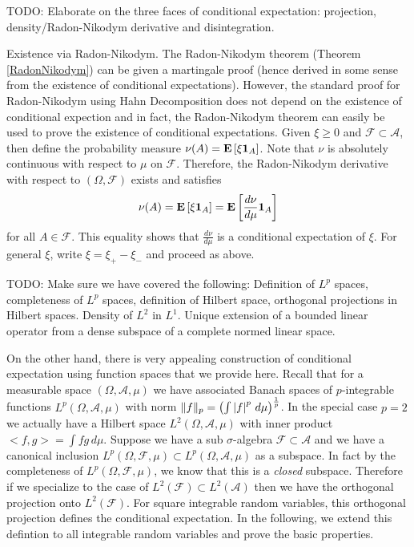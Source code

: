 TODO: Elaborate on the three faces of conditional expectation:
projection, density/Radon-Nikodym derivative and disintegration.

Existence via Radon-Nikodym.  The Radon-Nikodym theorem (Theorem
\ref{RadonNikodym}) can
be given a martingale proof (hence derived in some sense from the
existence of conditional expectations).  However, the standard proof
for Radon-Nikodym using
Hahn Decomposition does not depend on the existence of conditional
expection and in fact, the Radon-Nikodym theorem can easily be used to
prove the existence of conditional expectations.
Given $\xi \geq 0$ and $\mathcal{F} \subset \mathcal{A}$, then define
the probability measure $\nu(A) =
\textbf{E}\left[\xi \textbf{1}_{A}\right]$.  Note that $\nu$ is absolutely
continuous with respect to $\mu$ on $\mathcal{F}$.  Therefore, the Radon-Nikodym
derivative with respect to $(\Omega, \mathcal{F})$ exists and
satisfies 
\begin{align*}
\nu(A) = \textbf{E}\left[\xi \textbf{1}_{A}\right] =
\textbf{E}\left[\frac{d\nu}{d\mu} \textbf{1}_{A}\right]
\end{align*}
for all $A \in \mathcal{F}$.  This equality shows that
$\frac{d\nu}{d\mu}$ is a conditional expectation of $\xi$.  For
general $\xi$, write $\xi=\xi_+ - \xi_-$ and proceed as above.
 
TODO: Make sure we have covered the following:  Definition of $L^p$
spaces, completeness of $L^p$ spaces, definition of Hilbert space,
orthogonal projections in Hilbert spaces.  Density of $L^2$ in $L^1$.
Unique extension of a bounded linear operator from a dense subspace
of a complete normed linear space.

On the other hand, there is very appealing construction of conditional
expectation using function spaces that we provide here.  Recall that
for a measurable space $(\Omega, \mathcal{A}, \mu)$ we have associated
Banach spaces of $p$-integrable functions $L^p(\Omega, \mathcal{A}, \mu)$ with norm $\lVert f \rVert_p =
\left ( \int \left \vert f \right \vert^p \, d \mu \right ) ^ \frac{1}{p}$.  In the
special case $p=2$ we actually have a Hilbert space $L^2(\Omega,
\mathcal{A}, \mu)$ with inner product $<f, g> = \int f g \, d \mu$.
Suppose we have a sub $\sigma$-algebra $\mathcal{F} \subset
\mathcal{A}$ and we have a canonical inclusion $L^p(\Omega, \mathcal{F},
\mu) \subset L^p(\Omega, \mathcal{A},
\mu)$ as a subspace.  In fact by the completeness of $L^p(\Omega,
\mathcal{F},\mu)$, we know that this is a \emph{closed} subspace.
Therefore if we specialize to the case of $L^2(\mathcal{F}) \subset
L^2(\mathcal{A})$ then we have the orthogonal projection onto
$L^2(\mathcal{F})$.  For square integrable random variables, this
orthogonal projection defines the conditional expectation.  In the
following, we extend this defintion to all integrable random variables
and prove the basic properties.

